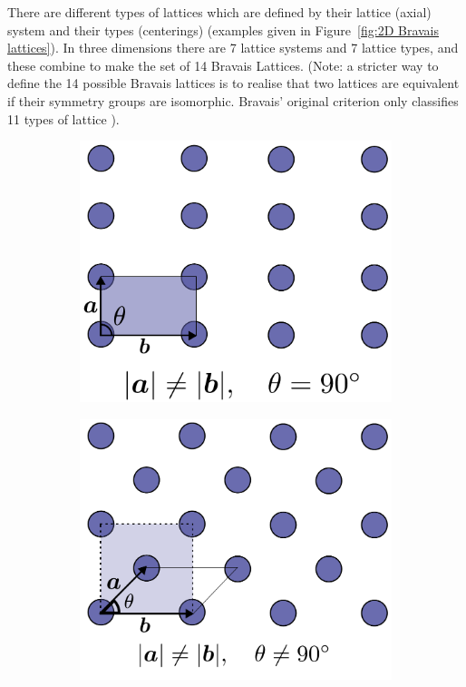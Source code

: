        There are different types of lattices which are defined by their lattice (axial) system and their types (centerings) (examples given in Figure~\ref{fig:2D Bravais lattices}).
        In three dimensions there are 7 lattice systems and 7 lattice types, and these combine to make the set of 14 Bravais Lattices.
        (Note: a stricter way to define the 14 possible Bravais lattices is to realise that two lattices are equivalent if their symmetry groups are isomorphic.
        Bravais' original criterion only classifies 11 types of lattice \cite{pitteri1996definition}).
        \begin{figure}
            \centering
            \begin{subfigure}[b]{0.45\textwidth}
                    \centering
                    \includegraphics[width=\textwidth]{figures/introduction/rectangularbravaislattice.pdf}
                    \caption{}
                    \label{fig:2D rectangular Bravais lattice}
            \end{subfigure}
            \qquad
            \begin{subfigure}[b]{0.45\textwidth}
                    \centering
                    \includegraphics[width=\textwidth]{figures/introduction/centredrectangularbravaislattice.pdf}

\end{subfigure}
\end{figure}
